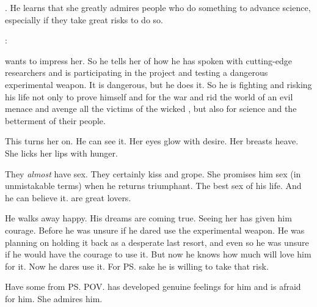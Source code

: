 . 
He learns that she greatly admires people who do something to advance science, especially if they take great risks to do so. 

\begin{prose}
  \Firaxel: 
\end{prose}

\Teshrial{} wants to impress her. 
So he tells her of how he has spoken with cutting-edge researchers and is participating in the \neoresphan{} project and testing a dangerous experimental weapon. 
It is dangerous, but he does it. 
So he is fighting and risking his life not only to prove himself and for the war and rid the world of an evil menace and avenge all the victims of the wicked \Ishnaruchaefir, but also for science and the betterment of their people. 

This turns her on. 
He can see it. 
Her eyes glow with desire. 
Her breasts heave. 
She licks her lips with hunger. 

They \emph{almost} have sex. 
They certainly kiss and grope. 
She promises him sex (in unmistakable terms) when he returns triumphant. 
The best sex of his life. 
And he can believe it. 
\Resviel{} are great lovers. 

He walks away happy. 
His dreams are coming true. 
Seeing her has given him courage. 
Before he was unsure if he dared use the experimental weapon. 
He was planning on holding it back as a desperate last resort, and even so he was unsure if he would have the courage to use it. 
But now he knows how much \Firaxel{} will love him for it. 
Now he dares use it. 
For \ps{\Firaxel} sake he is willing to take that risk. 

Have some from \ps{\Firaxel} POV. 
\Firaxel{} has developed genuine feelings for him and is afraid for him. 
She admires him. 

\begin{prose}
\end{prose}

